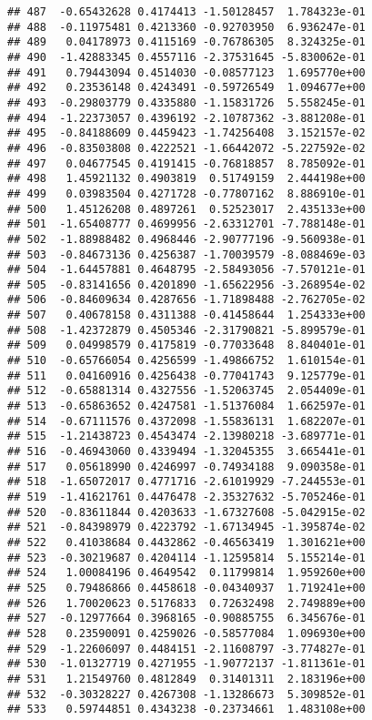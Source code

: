 \documentclass[
]{article}
\begin{document}
\begin{verbatim}
## 487  -0.65432628 0.4174413 -1.50128457  1.784323e-01
## 488  -0.11975481 0.4213360 -0.92703950  6.936247e-01
## 489   0.04178973 0.4115169 -0.76786305  8.324325e-01
## 490  -1.42883345 0.4557116 -2.37531645 -5.830062e-01
## 491   0.79443094 0.4514030 -0.08577123  1.695770e+00
## 492   0.23536148 0.4243491 -0.59726549  1.094677e+00
## 493  -0.29803779 0.4335880 -1.15831726  5.558245e-01
## 494  -1.22373057 0.4396192 -2.10787362 -3.881208e-01
## 495  -0.84188609 0.4459423 -1.74256408  3.152157e-02
## 496  -0.83503808 0.4222521 -1.66442072 -5.227592e-02
## 497   0.04677545 0.4191415 -0.76818857  8.785092e-01
## 498   1.45921132 0.4903819  0.51749159  2.444198e+00
## 499   0.03983504 0.4271728 -0.77807162  8.886910e-01
## 500   1.45126208 0.4897261  0.52523017  2.435133e+00
## 501  -1.65408777 0.4699956 -2.63312701 -7.788148e-01
## 502  -1.88988482 0.4968446 -2.90777196 -9.560938e-01
## 503  -0.84673136 0.4256387 -1.70039579 -8.088469e-03
## 504  -1.64457881 0.4648795 -2.58493056 -7.570121e-01
## 505  -0.83141656 0.4201890 -1.65622956 -3.268954e-02
## 506  -0.84609634 0.4287656 -1.71898488 -2.762705e-02
## 507   0.40678158 0.4311388 -0.41458644  1.254333e+00
## 508  -1.42372879 0.4505346 -2.31790821 -5.899579e-01
## 509   0.04998579 0.4175819 -0.77033648  8.840401e-01
## 510  -0.65766054 0.4256599 -1.49866752  1.610154e-01
## 511   0.04160916 0.4256438 -0.77041743  9.125779e-01
## 512  -0.65881314 0.4327556 -1.52063745  2.054409e-01
## 513  -0.65863652 0.4247581 -1.51376084  1.662597e-01
## 514  -0.67111576 0.4372098 -1.55836131  1.682207e-01
## 515  -1.21438723 0.4543474 -2.13980218 -3.689771e-01
## 516  -0.46943060 0.4339494 -1.32045355  3.665441e-01
## 517   0.05618990 0.4246997 -0.74934188  9.090358e-01
## 518  -1.65072017 0.4771716 -2.61019929 -7.244553e-01
## 519  -1.41621761 0.4476478 -2.35327632 -5.705246e-01
## 520  -0.83611844 0.4203633 -1.67327608 -5.042915e-02
## 521  -0.84398979 0.4223792 -1.67134945 -1.395874e-02
## 522   0.41038684 0.4432862 -0.46563419  1.301621e+00
## 523  -0.30219687 0.4204114 -1.12595814  5.155214e-01
## 524   1.00084196 0.4649542  0.11799814  1.959260e+00
## 525   0.79486866 0.4458618 -0.04340937  1.719241e+00
## 526   1.70020623 0.5176833  0.72632498  2.749889e+00
## 527  -0.12977664 0.3968165 -0.90885755  6.345676e-01
## 528   0.23590091 0.4259026 -0.58577084  1.096930e+00
## 529  -1.22606097 0.4484151 -2.11608797 -3.774827e-01
## 530  -1.01327719 0.4271955 -1.90772137 -1.811361e-01
## 531   1.21549760 0.4812849  0.31401311  2.183196e+00
## 532  -0.30328227 0.4267308 -1.13286673  5.309852e-01
## 533   0.59744851 0.4343238 -0.23734661  1.483108e+00

\end{verbatim}
\end{document}
